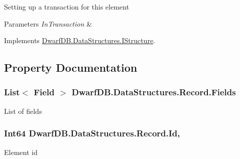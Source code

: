 Setting up a transaction for this element 


\begin{DoxyParams}{Parameters}
{\em In\+Transaction} & \\
\hline
\end{DoxyParams}


Implements \hyperlink{interface_dwarf_d_b_1_1_data_structures_1_1_i_structure_aa89d0ecc5915538b89865bc3086d8b0a}{Dwarf\+D\+B.\+Data\+Structures.\+I\+Structure}.



\subsection{Property Documentation}
\hypertarget{class_dwarf_d_b_1_1_data_structures_1_1_record_ae901326df950b811aa2cbb5f632a21c3}{
\subsubsection[{Fields}]{\setlength{\rightskip}{0pt plus 5cm}List$<$ {\bf Field} $>$ Dwarf\+D\+B.\+Data\+Structures.\+Record.\+Fields\hspace{0.3cm}{\ttfamily [get]}}}\label{class_dwarf_d_b_1_1_data_structures_1_1_record_ae901326df950b811aa2cbb5f632a21c3}


List of fields 

\hypertarget{class_dwarf_d_b_1_1_data_structures_1_1_record_a6b9df97308b20ff8504cd88c56aded41}{
\subsubsection[{Id}]{\setlength{\rightskip}{0pt plus 5cm}Int64 Dwarf\+D\+B.\+Data\+Structures.\+Record.\+Id\hspace{0.3cm}{\ttfamily [get]}, {\ttfamily [set]}}}\label{class_dwarf_d_b_1_1_data_structures_1_1_record_a6b9df97308b20ff8504cd88c56aded41}


Element id 

